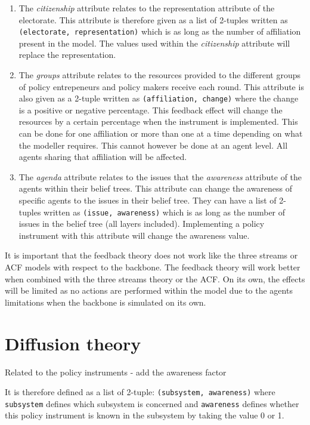 \begin{enumerate}
\item The \emph{citizenship} attribute relates to the representation attribute of the electorate. This attribute is therefore given as a list of 2-tuples written as \texttt{(electorate, representation)} which is as long as the number of affiliation present in the model. The values used within the \emph{citizenship} attribute will replace the representation.
\item The \emph{groups} attribute relates to the resources provided to the different groups of policy entrepeneurs and policy makers receive each round. This attribute is also given as a 2-tuple written as \texttt{(affiliation, change)} where the change is a positive or negative percentage. This feedback effect will change the resources by a certain percentage when the instrument is implemented. This can be done for one affiliation or more than one at a time depending on what the modeller requires. This cannot however be done at an agent level. All agents sharing that affiliation will be affected.
\item The \emph{agenda} attribute relates to the issues that the \emph{awareness} attribute of the agents within their belief trees. This attribute can change the awareness of specific agents to the issues in their belief tree. They can have a list of 2-tuples written as \texttt{(issue, awareness)} which is as long as the number of issues in the belief tree (all layers included). Implementing a policy instrument with this attribute will change the awareness value.
\end{enumerate}


It is important that the feedback theory does not work like the three streams or ACF models with respect to the backbone. The feedback theory will work better when combined with the three streams theory or the ACF. On its own, the effects will be limited as no actions are performed within the model due to the agents limitations when the backbone is simulated on its own. 


\section{Diffusion theory}


Related to the policy instruments - add the awareness factor


It is therefore defined as a list of 2-tuple: \texttt{(subsystem, awareness)} where \texttt{subsystem} defines which subsystem is concerned and \texttt{awareness} defines whether this policy instrument is known in the subsystem by taking the value 0 or 1.




